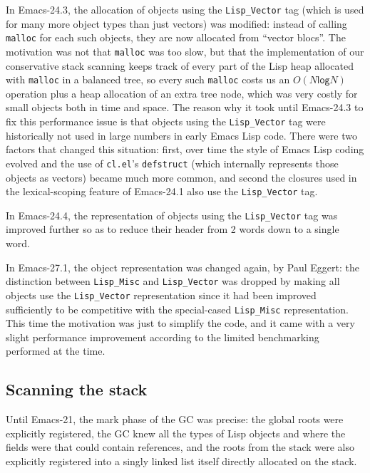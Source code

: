 \documentclass[format=acmsmall, review]{acmart}
\newcommand \Elisp {Emacs Lisp}
\begin{document}
In Emacs-24.3, the allocation of objects using the \texttt{Lisp\_Vector} tag
(which is used for many more object types than just vectors) was modified:
instead of calling \texttt{malloc} for each such objects, they are now
allocated from ``vector blocs''.  The motivation was not that
\texttt{malloc} was too slow, but that the implementation of our
conservative stack scanning keeps track of every part of the Lisp heap
allocated with \texttt{malloc} in a balanced tree, so every such
\texttt{malloc} costs us an $O(N \textsf{log} N)$ operation plus a heap
allocation of an extra tree node, which was very costly for small objects
both in time and space.  The reason why it took until Emacs-24.3 to fix this
performance issue is that objects using the \texttt{Lisp\_Vector} tag were
historically not used in large numbers in early \Elisp{} code.  There were
two factors that changed this situation: first, over time the style of
\Elisp{} coding evolved and the use of \texttt{cl.el}'s \texttt{defstruct}
(which internally represents those objects as vectors) became much more
common, and second the closures used in the lexical-scoping feature of
Emacs-24.1 also use the \texttt{Lisp\_Vector} tag.

In Emacs-24.4, the representation of objects using the \texttt{Lisp\_Vector}
tag was improved further so as to reduce their header from 2 words down to
a single word.

In Emacs-27.1, the object representation was changed again, by Paul Eggert:
the distinction between \texttt{Lisp\_Misc} and \texttt{Lisp\_Vector} was
dropped by making all objects use the \texttt{Lisp\_Vector} representation
since it had been improved sufficiently to be competitive with the
special-cased \texttt{Lisp\_Misc} representation.  This time the motivation
was just to simplify the code, and it came with a very
slight performance improvement according to the limited benchmarking
performed at the time.

\subsection{Scanning the stack}
\label{sec:stack-scanning}

Until Emacs-21, the mark phase of the GC was precise: the global roots were
explicitly registered, the GC knew all the types of Lisp objects and where
the fields were that could contain references, and the roots from the stack
were also explicitly registered into a singly linked list itself directly
allocated on the stack.
\end{document}
